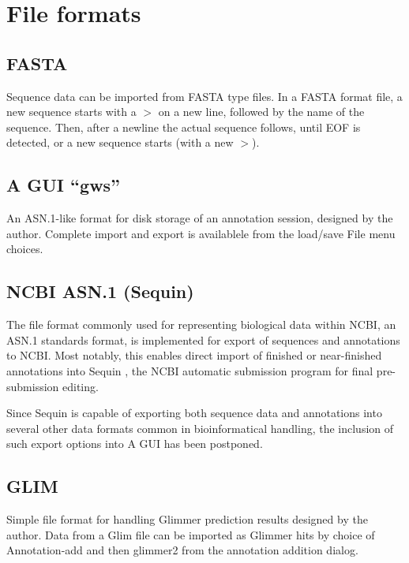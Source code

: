 \section{File formats}

\subsection{FASTA}
Sequence data can be imported from FASTA type files. In a FASTA format
file, a new sequence starts with a $>$ on a new line, followed by the
name of the sequence. Then, after a newline the actual sequence
follows, until EOF is detected, or a new sequence starts (with a new
$>$).


\subsection{A GUI ``gws''}
An ASN.1-like format for disk storage of an annotation session,
designed by the author.  Complete import and export is availablele
from the load/save File menu choices.

\subsection{NCBI ASN.1 (Sequin)}
The file format commonly used for representing biological data within
NCBI, an ASN.1 standards format, is implemented for export of
sequences and annotations to NCBI. Most notably, this enables direct
import of finished or near-finished annotations into Sequin 
, the NCBI automatic submission program for final pre-submission
editing.

Since Sequin is capable of exporting both sequence data and
annotations into several other data formats common in bioinformatical
handling, the inclusion of such export options into A GUI has been
postponed.


\subsection{GLIM}
Simple file format for handling Glimmer prediction results designed by
the author.  Data from a Glim file can be imported as Glimmer hits by
choice of Annotation-add and then glimmer2 from the annotation
addition dialog.

